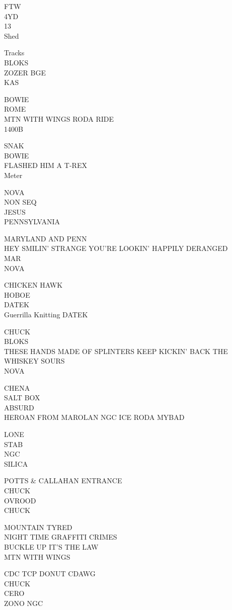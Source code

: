 \documentclass[10pt,letterpaper]{article}
\begin{document}
FTW\\
4YD\\
13\\
Shed

Tracks\\
BLOKS\\
ZOZER BGE\\
KAS

BOWIE\\
ROME\\
MTN WITH WINGS RODA RIDE\\
1400B

SNAK\\
BOWIE\\
FLASHED HIM A T{-}REX\\
Meter

NOVA\\
NON SEQ\\
JESUS\\
PENNSYLVANIA

MARYLAND AND PENN\\
HEY SMILIN' STRANGE YOU'RE LOOKIN' HAPPILY DERANGED\\
MAR\\
NOVA

CHICKEN HAWK\\
HOBOE\\
DATEK\\
Guerrilla Knitting DATEK

CHUCK\\
BLOKS\\
THESE HANDS MADE OF SPLINTERS KEEP KICKIN' BACK THE WHISKEY SOURS\\
NOVA

CHENA\\
SALT BOX\\
ABSURD\\
HEROAN FROM MAROLAN NGC ICE RODA MYBAD

LONE\\
STAB\\
NGC\\
SILICA

POTTS \& CALLAHAN ENTRANCE\\
CHUCK\\
OVROOD\\
CHUCK

MOUNTAIN TYRED\\
NIGHT TIME GRAFFITI CRIMES\\
BUCKLE UP IT'S THE LAW\\
MTN WITH WINGS

CDC TCP DONUT CDAWG\\
CHUCK\\
CERO\\
ZONO NGC
\end{document}
